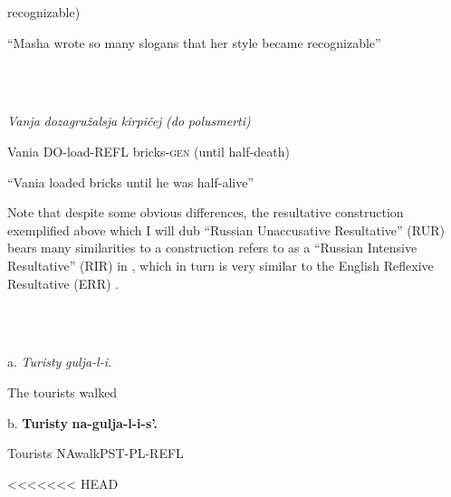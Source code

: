 \documentclass[output=paper,modfonts, nonflat]{langsci/langscibook}
\begin{document}
\begin{styleinnerExample}
  recognizable)
\end{styleinnerExample}

\begin{styleinnerExample}
  “Masha wrote so many slogans that her style became recognizable”
\end{styleinnerExample}

\begin{styleinnerExample}
\ea%
    \label{ex:key:34}
    \gll\\
        \\
    \glt
    \z

          \textit{Vanja} \textit{dozagružalsja}    \textit{kirpičej}      \textit{(do}    \textit{polusmerti)}
\end{styleinnerExample}

\begin{styleinnerExample}
  Vania DO-load-REFL bricks-\textsc{gen} (until half-death)
\end{styleinnerExample}

\begin{styleinnerExample}
  “Vania loaded bricks until he was half-alive”
\end{styleinnerExample}

Note that despite some obvious differences, the resultative construction exemplified above which I will dub “Russian Unaccusative Resultative” (RUR) bears many similarities to a construction \citet{Tatevosov2010} refers to as a “Russian Intensive Resultative” (RIR) in , which in turn is very similar to the English Reflexive Resultative (ERR) .

\begin{styleinnerExample}
\ea%
    \label{ex:key:35}
    \gll\\
        \\
    \glt
    \z

           a.  \textit{Turisty} \textit{gulja-l-i.}
\end{styleinnerExample}

\begin{styleinnerExample}
    The tourists walked
\end{styleinnerExample}

\begin{styleinnerExample}
  b.  \textbf{Turisty} \textbf{na-gulja-l-i-s’.} 
\end{styleinnerExample}

\begin{styleinnerExample}
    Tourists NAwalkPST-PL-REFL
\end{styleinnerExample}
<<<<<<< HEAD
\end{document}
